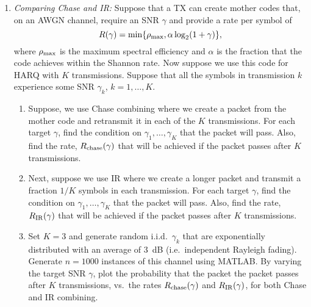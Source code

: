 \documentclass[11pt]{article}
\begin{document}
\begin{enumerate}
\item \emph{Comparing Chase and IR:}
Suppose that a TX can create mother codes
that, on an AWGN channel, require an  SNR $\gamma$
and provide a rate per symbol of
\[
    R(\gamma)
    = \min\{ \rho_{\rm max}, \alpha \log_2(1+\gamma) \},
\]
where $\rho_{\rm max}$ is the maximum spectral efficiency
and $\alpha$ is the fraction that the code achieves within
the Shannon rate.
Now suppose we use this code for HARQ  with $K$ transmissions.
Suppose that all the symbols in  transmission $k$ experience
some SNR $\gamma_k$, $k=1,\ldots,K$.
\begin{enumerate}[label=(\alph*)]
\item Suppose, we use Chase combining where we
create a packet from the mother code and retransmit it
in each of the $K$ transmissions.  For each target $\gamma$,
find the condition on $\gamma_1,\ldots,\gamma_K$ that the
packet will pass.  Also, find the rate, $R_{\rm chase}(\gamma)$ that will be achieved if
the packet passes after $K$ transmissions.

\item Next, suppose we use IR where we create a longer packet
and transmit a fraction $1/K$ symbols in each transmission.
For each target $\gamma$,
find the condition on $\gamma_1,\ldots,\gamma_K$ that the
packet will pass.  Also, find the rate, $R_{\rm IR}(\gamma)$ that will be achieved if
the packet passes after $K$ transmissions.

\item Set $K=3$ and generate random i.i.d.\ $\gamma_k$
that are exponentially distributed with an average of \SI{3}{dB} (i.e.\ independent Rayleigh fading).
Generate $n=1000$ instances of this channel
using MATLAB.
By varying the target SNR $\gamma$,
plot the probability that the packet the packet passes
after $K$ transmissions, 
vs.\ the rates $R_{\rm chase}(\gamma)$ and 
$R_{\rm IR}(\gamma)$, for both Chase and IR combining.

\end{enumerate}



\end{enumerate}
\end{document}
